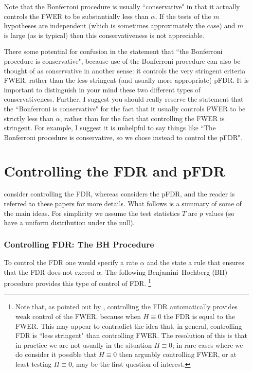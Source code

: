 \documentclass[times,11pt]{article}
\begin{document}
Note that the Bonferroni procedure is usually ``conservative" in that it actually controls the
FWER to be substantially less than $\alpha$. If the tests of the $m$ hypotheses are independent (which is sometimes approximately the case) and $m$ is large (as is typical) then this conservativeness is not appreciable.

There some potential for confusion in the statement that ``the Bonferroni procedure is conservative", because use of the Bonferroni procedure can also be thought of as conservative in another sense: it controls the very stringent criteria FWER, rather than the less stringent (and usually more appropriate) pFDR. It is important to distinguish in your mind these two different types of conservativeness. Further, I suggest you should really reserve the statement that the ``Bonferroni is conservative" for the fact that it usually controls FWER to be strictly less than $\alpha$, rather
than for the fact that controlling the FWER is stringent.   For example, I suggest it is unhelpful to say things like ``The Bonferroni procedure is conservative, so we chose instead to control the pFDR". 

\section{Controlling the FDR and pFDR}

\cite{benjamini.hochberg.95} consider controlling the FDR, whereas \cite{storey.02,storey.03} considers the  pFDR, and the reader is referred to these papers for more details. What follows is a summary of some of the main ideas.  For simplicity we assume
the test statistics $T$ are $p$ values (so have a uniform distribution under the null).

\subsubsection{Controlling FDR: The BH Procedure}

To control the FDR one would specify a rate $\alpha$ and the state a rule that ensures that the FDR does not exceed $\alpha$. The following Benjamini--Hochberg (BH) procedure provides this type of control of FDR. \footnote{Note that, as pointed out by \cite{benjamini.hochberg.95}, controlling the FDR automatically provides weak control of the FWER, because when $H \equiv 0$ the FDR is equal to the FWER. This may appear to contradict the idea that, in general, controlling FDR is ``less stringent" than controlling FWER. The resolution of this is that in practice we are not usually in the situation $H \equiv 0$; in rare cases where we do consider it possible that $H \equiv 0$ then arguably controlling FWER, or at least testing $H \equiv 0$, may be the first question of interest.}
\end{document}
